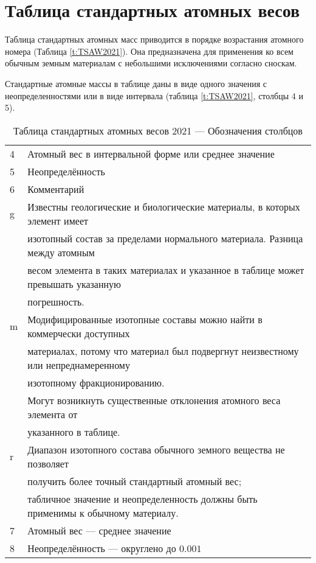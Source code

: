 \documentclass[a5paper,openany]{book}
\begin{document}
\section{Таблица стандартных атомных весов} \label{s:TableStandardAtomicWeights}

Таблица стандартных атомных масс \cite{IUPAC2021} приводится в порядке возрастания атомного номера (Таблица \ref{t:TSAW2021}). Она предназначена для применения ко всем обычным земным материалам с небольшими исключениями 
согласно сноскам. %

Стандартные атомные массы в таблице даны в виде одного значения с неопределенностями или в виде интервала (таблица \ref{t:TSAW2021}, столбцы 4 и 5). 

\begin{table}[h!]
	{\scriptsize 
		\begin{tabular}{ll}
			4 & Атомный вес в интервальной форме или среднее значение \\
			5 & Неопределённость \\	
			6 & Комментарий \\
			g & Известны геологические и биологические материалы, в которых элемент имеет  \\
			~ & изотопный состав за пределами нормального материала. Разница между атомным  \\
			~ & весом элемента в таких материалах и указанное в таблице может превышать указанную  \\
			~ & погрешность.\\
			m & Модифицированные изотопные составы можно найти в коммерчески доступных  \\
			~ & материалах, потому что материал был подвергнут неизвестному или непреднамеренному \\
			~ & изотопному фракционированию. \\ 
			~ & Могут возникнуть существенные отклонения атомного веса элемента от \\
			~ & указанного в таблице. \\
			r & Диапазон изотопного состава обычного земного вещества не позволяет \\
			~ & получить более точный  стандартный атомный вес; \\
			~ & табличное значение и неопределенность должны быть применимы к обычному материалу.\\
			7 & Атомный вес --- среднее значение \\
			8 & Неопределённость --- округлено до $0.001$
		\end{tabular}
	}
	\caption{Таблица стандартных атомных весов 2021 --- Обозначения столбцов}
	\label{t:TSAW2021Notes}
\end{table}
\end{document}
